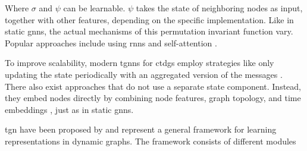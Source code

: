 Where $\sigma$ and $\psi$ can be learnable. $\psi$ takes the state of neighboring nodes as input, together with other features, depending on the specific implementation. Like in static \glspl{gnn}, the actual mechanisms of this permutation invariant function vary. Popular approaches include using \glspl{rnn} \cite{ma_streaming_2018} and self-attention \cite{rossi_temporal_2020}.

To improve scalability, modern \glspl{tgnn} for \glspl{ctdg} employ strategies like only updating the state periodically with an aggregated version of the messages \cite{rossi_temporal_2020}. There also exist approaches that do not use a separate state component. Instead, they embed nodes directly by combining node features, graph topology, and time embeddings \cite{longa_graph_2023, xu_inductive_2020}, just as in static \glspl{gnn}.




\iffalse
\gls{tgn} have been proposed by \cite{rossi_temporal_2020} and represent a general framework for learning representations in dynamic graphs. The framework consists of different modules

